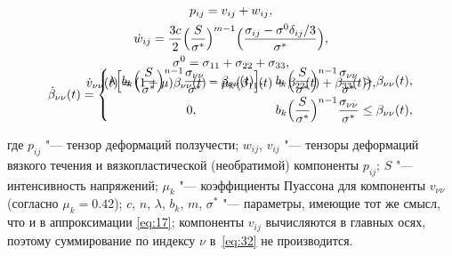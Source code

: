 \begin{gather}

p_{ij} =  v _{ij} + w_{ij}, \\

\dot {w}_{ij} = \frac {3c} 2  \Bigl( \frac{S}{\sigma^{\ast}} \Bigr)^{m - 1} \Bigl(\frac{\sigma_{ij} - \sigma^0\delta_{ij}/3}{\sigma^{\ast}} \Bigr), \\

\sigma^0 = \sigma_{11} + \sigma_{22} + \sigma_{33}, \\

\vspace{-8mm}

\label{eq:32}

\dot{ v }_{\nu \nu } ( t ) = (1 + \mu) \beta_{\nu \nu} (t) - \mu_k \bigl(\beta_{11}(t)+\beta_{22}(t)+\beta_{33}(t) \bigr), \\ 

\dot {\beta}_{\nu \nu } ( t ) =

\begin{cases}

\lambda \Bigl[ b_k \Bigl( \dfrac{S}{\sigma^{\ast}} \Bigr)^{n-1} \dfrac{\sigma_{\nu \nu}}{\sigma^{\ast}}-\beta_{\nu \nu} ( t ) \Bigr], 

&

b_k \Bigl( \dfrac{S}{\sigma^{\ast}} \Bigr)^{n-1} \dfrac{\sigma_{\nu \nu}}{\sigma^{\ast}} > \beta_{\nu \nu}( t ), \\[2mm]

\hspace{2.2cm}0, &

b_k \Bigl( \dfrac{S}{\sigma^{\ast}} \Bigr)^{n-1} \dfrac{\sigma_{\nu \nu}}{\sigma^{\ast}}  \le \beta_{\nu \nu}( t ), \\

\end{cases}

\end{gather}

где $p_{ij}$  "--- тензор деформаций ползучести; $w_{ij}$, $ v _{ij}$ "--- тензоры деформаций вязкого течения и вязкопластической (необратимой) компоненты $p_{ij}$; $S$ "--- интенсивность напряжений; $\mu_k$ "--- коэффициенты Пуассона для компоненты $ v _{\nu \nu}$ (согласно \cite{27-Samarin1979} $\mu_k=0.42$); $c$, $n$, $\lambda$, $b_k$, $m$, $\sigma^{\ast}$ "--- параметры, имеющие тот же смысл, что и в аппроксимации \eqref{eq:17}; компоненты $ v _{ij}$ вычисляются в главных осях, поэтому суммирование по индексу $\nu$ в~\eqref{eq:32} не производится.



